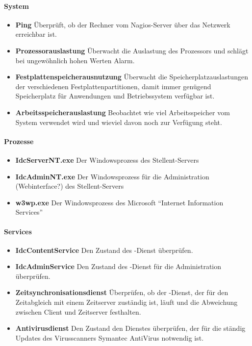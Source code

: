 \paragraph{System}
\begin{itemize}
\item \textbf{Ping} Überprüft, ob der Rechner vom Nagios-Server über das Netzwerk erreichbar ist.
\item \textbf{Prozessorauslastung} Überwacht die Auslastung des Prozessors und schlägt bei ungewöhnlich hohen Werten Alarm.
\item \textbf{Festplattenspeicherausnutzung} Überwacht die Speicherplatzauslastungen der verschiedenen Festplattenpartitionen, damit immer genügend Speicherplatz für Anwendungen und Betriebssystem verfügbar ist.
\item \textbf{Arbeitsspeicherauslastung} Beobachtet wie viel Arbeitsspeicher vom System verwendet wird und wieviel davon noch zur Verfügung steht.
\end{itemize}

\paragraph{Prozesse}
\begin{itemize}
\item \textbf{IdcServerNT.exe} Der Windowsprozess des Stellent-Servers
\item \textbf{IdcAdminNT.exe} Der Windowsprozess für die Administration (Webinterface?) des Stellent-Servers
\item \textbf{w3wp.exe} Der Windowsprozess des Microsoft "`Internet Information Services"'
\end{itemize}

\paragraph{Services}
\begin{itemize}
\item \textbf{IdcContentService}  Den Zustand des -Dienst überprüfen.
\item \textbf{IdcAdminService}  Den Zustand des -Dienst für die Administration überprüfen.
\item \textbf{Zeitsynchronisationsdienst} Überprüfen, ob der -Dienst, der für den Zeitabgleich mit einem Zeitserver zuständig ist, läuft und die Abweichung zwischen Client und Zeitserver festhalten.
\item \textbf{Antivirusdienst} Den Zustand den Dienstes überprüfen, der für die ständig Updates des Virusscanners Symantec AntiVirus notwendig ist.
\end{itemize}

